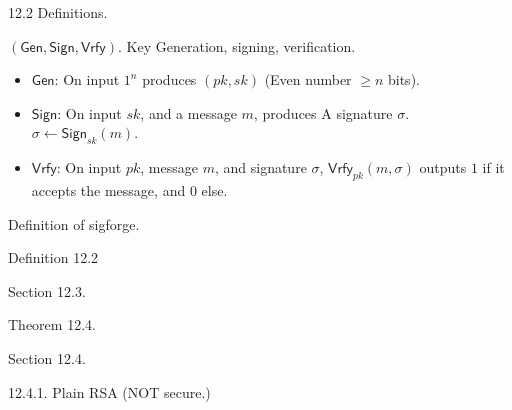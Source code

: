 \documentclass[12pt]{article}
\newcommand{\Sign}{\mathsf{Sign}}
\newcommand{\Vrfy}{\mathsf{Vrfy}}
\newcommand{\Gen}{\mathsf{Gen}}
\newcommand{\from}{\leftarrow}
\begin{document}
12.2 Definitions.

$(\Gen,\Sign,\Vrfy)$. Key Generation, signing, verification.\begin{itemize}

\item $\Gen$: On input $1^n$ produces $(pk,sk)$ (Even number $\geq n$ bits). 

\item $\Sign$: On input \underline{$sk$}, and a message $m$, produces A signature $\sigma$. $\sigma\from\Sign_{sk}(m)$.

\item $\Vrfy$: On input $pk$, message $m$, and signature $\sigma$, $\Vrfy_{pk}(m,\sigma)$ outputs $1$ if it accepts the message, and $0$ else.

\end{itemize}

Definition of sigforge.

Definition 12.2

Section 12.3.

Theorem 12.4.

Section 12.4.

12.4.1. Plain RSA (NOT secure.)
\end{document}

